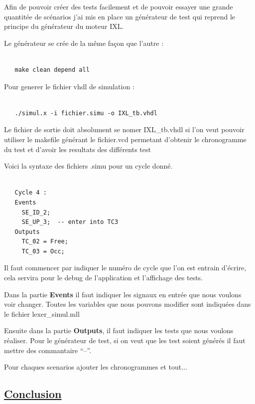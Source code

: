\medskip

Afin de pouvoir créer des tests facilement et de pouvoir essayer une
grande quantitée de scénarios j'ai mis en place un générateur de test
qui reprend le principe du générateur du moteur IXL.

\smallskip

Le générateur se crée de la même façon que l'autre :

\begin{lstlisting}

   make clean depend all

\end{lstlisting}
  
\medskip

Pour generer le fichier vhdl de simulation :

\begin{lstlisting}

   ./simul.x -i fichier.simu -o IXL_tb.vhdl 

\end{lstlisting}

\medskip

Le fichier de sortie doit absolument se nomer IXL\_tb.vhdl si l'on
veut pouvoir utiliser le makefile générant le fichier.vcd permetant
d'obtenir le chronogramme du test et d'avoir les resultats des
différents test   

\medskip

Voici la syntaxe des fichiers .simu pour un cycle donné.

\begin{lstlisting}

   Cycle 4 :
   Events
     SE_ID_2;  
     SE_UP_3;  -- enter into TC3	
   Outputs
     TC_02 = Free;
     TC_03 = Occ;  

\end{lstlisting}

\medskip

Il faut commencer par indiquer le numéro de cycle que l'on est entrain
d'écrire, cela servira pour le debug de l'application et l'affichage
des tests.

\medskip

Dans la partie \textbf{Events} il faut indiquer les signaux en entrée que nous
voulons voir changer. Toutes les variables que nous pouvons modifier
sont indiquées dans le fichier lexer\_simul.mll 

\medskip

Ensuite dans la partie \textbf{Outputs}, il faut indiquer les tests
que nous voulons réaliser.
Pour le générateur de test, si on veut que les test soient générés il
faut mettre des commantaire ``--''.

\bigskip

Pour chaques scenarios ajouter les chronogrammes et tout...

\subsection{\underline{Conclusion}}
\label{sec:Conclusion}


\newpage





